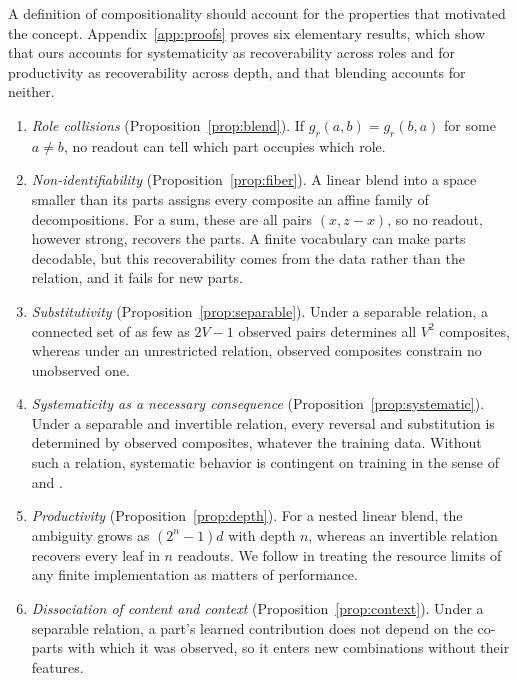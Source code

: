 \documentclass{article}
\theoremstyle{definition}
\theoremstyle{plain}
\theoremstyle{remark}
\begin{document}
A definition of compositionality should account for the properties
that motivated the concept. Appendix~\ref{app:proofs} proves six
elementary results, which show that ours accounts for systematicity as
recoverability across roles and for productivity as recoverability
across depth, and that blending accounts for neither.

\begin{enumerate}[leftmargin=*]
  \item {\it Role collisions\/} (Proposition~\ref{prop:blend}). If
  $g_r(a, b) = g_r(b, a)$ for some $a \neq b$, no readout can tell which
  part occupies which role.
  \item {\it Non-identifiability\/} (Proposition~\ref{prop:fiber}). A
  linear blend into a space smaller than its parts assigns every
  composite an affine family of decompositions. For a sum, these are
  all pairs $(x, z - x)$, so no readout, however strong, recovers the
  parts. A finite vocabulary can make parts decodable, but this
  recoverability comes from the data rather than the relation, and it
  fails for new parts.
  \item {\it Substitutivity\/} (Proposition~\ref{prop:separable}). Under
  a separable relation, a connected set of as few as $2V - 1$ observed
  pairs determines all $V^2$ composites, whereas under an unrestricted
  relation, observed composites constrain no unobserved one.
  \item {\it Systematicity as a necessary consequence\/}
  (Proposition~\ref{prop:systematic}). Under a separable and invertible
  relation, every reversal and substitution is determined by observed
  composites, whatever the training data. Without such a relation,
  systematic behavior is contingent on training in the sense of
  \citet{fodor1990} and \citet{aizawa2003}.
  \item {\it Productivity\/} (Proposition~\ref{prop:depth}). For a nested
  linear blend, the ambiguity grows as $(2^n - 1)d$ with depth $n$,
  whereas an invertible relation recovers every leaf in $n$ readouts.
  We follow \citet{fodor1988} in treating the resource limits of any
  finite implementation as matters of performance.
  \item {\it Dissociation of content and context\/}
  (Proposition~\ref{prop:context}). Under a separable relation, a part's
  learned contribution does not depend on the co-parts with which it was
  observed, so it enters new combinations without their features.
\end{enumerate}
\end{document}
